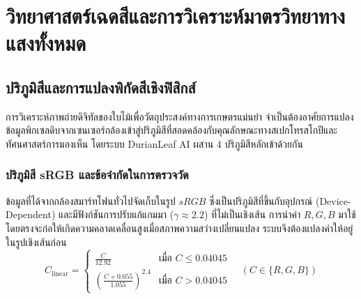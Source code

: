 \chapter{วิทยาศาสตร์เฉดสีและการวิเคราะห์มาตรวิทยาทางแสงทั้งหมด}

\section{ปริภูมิสีและการแปลงพิกัดสีเชิงฟิสิกส์}
การวิเคราะห์ภาพถ่ายดิจิทัลของใบไม้เพื่อวัตถุประสงค์ทางการเกษตรแม่นยำ จำเป็นต้องอาศัยการแปลงข้อมูลพิกเซลดิบจากเซนเซอร์กล้องเข้าสู่ปริภูมิสีที่สอดคล้องกับคุณลักษณะทางสเปกโทรสโกปีและทัศนศาสตร์การมองเห็น โดยระบบ DurianLeaf AI ผสาน 4 ปริภูมิสีหลักเข้าด้วยกัน

\subsection{ปริภูมิสี sRGB และข้อจำกัดในการตรวจวัด}
ข้อมูลที่ได้จากกล้องสมาร์ทโฟนทั่วไปจัดเก็บในรูป $sRGB$ ซึ่งเป็นปริภูมิสีที่ขึ้นกับอุปกรณ์ (Device-Dependent) และมีฟังก์ชันการปรับแก้แกมมา ($\gamma \approx 2.2$) ที่ไม่เป็นเชิงเส้น การนำค่า $R, G, B$ มาใช้โดยตรงจะก่อให้เกิดความคลาดเคลื่อนสูงเมื่อสภาพความสว่างเปลี่ยนแปลง ระบบจึงต้องแปลงค่าให้อยู่ในรูปเชิงเส้นก่อน
\begin{equation}
  C_{\text{linear}} = \begin{cases}
    \frac{C}{12.92} & \text{เมื่อ } C \le 0.04045 \\
    \left( \frac{C + 0.055}{1.055} \right)^{2.4} & \text{เมื่อ } C > 0.04045
  \end{cases}
  \quad (C \in \{R, G, B\})
\end{equation}

